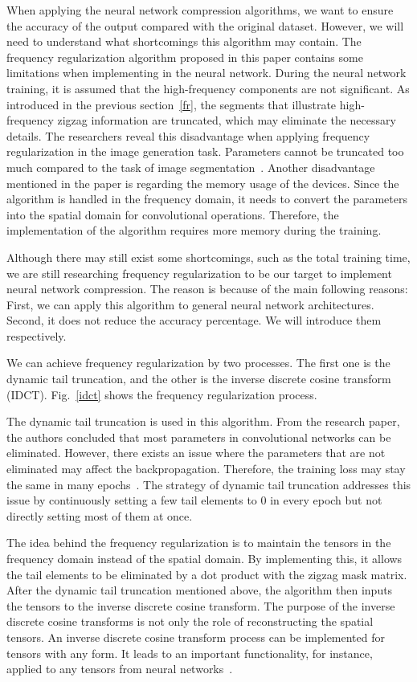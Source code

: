 \documentclass{article}
\begin{document}
When applying the neural network compression algorithms, we want to ensure the accuracy of the output compared with the original dataset. However, we will need to understand what shortcomings this algorithm may contain. The frequency regularization algorithm proposed in this paper contains some limitations when implementing in the neural network. During the neural network training, it is assumed that the high-frequency components are not significant. As introduced in the previous section~\ref{fr}, the segments that illustrate high-frequency zigzag information are truncated, which may eliminate the necessary details. The researchers reveal this disadvantage when applying frequency regularization in the image generation task. Parameters cannot be truncated too much compared to the task of image segmentation~\cite{zhao2023frequency}. Another disadvantage mentioned in the paper is regarding the memory usage of the devices. Since the algorithm is handled in the frequency domain, it needs to convert the parameters into the spatial domain for convolutional operations. Therefore, the implementation of the algorithm requires more memory during the training. 

Although there may still exist some shortcomings, such as the total training time, we are still researching frequency regularization to be our target to implement neural network compression. The reason is because of the main following reasons: First, we can apply this algorithm to general neural network architectures. Second, it does not reduce the accuracy percentage. We will introduce them respectively. 

We can achieve frequency regularization by two processes. The first one is the dynamic tail truncation, and the other is the inverse discrete cosine transform (IDCT). Fig.~\ref{idct} shows the frequency regularization process. 

The dynamic tail truncation is used in this algorithm. From the research paper, the authors concluded that most parameters in convolutional networks can be eliminated. However, there exists an issue where the parameters that are not eliminated may affect the backpropagation. Therefore, the training loss may stay the same in many epochs~\cite{zhao2023frequency}. The strategy of dynamic tail truncation addresses this issue by continuously setting a few tail elements to 0 in every epoch but not directly setting most of them at once.

The idea behind the frequency regularization is to maintain the tensors in the frequency domain instead of the spatial domain. By implementing this, it allows the tail elements to be eliminated by a dot product with the zigzag mask matrix. After the dynamic tail truncation mentioned above, the algorithm then inputs the tensors to the inverse discrete cosine transform. The purpose of the inverse discrete cosine transforms is not only the role of reconstructing the spatial tensors. An inverse discrete cosine transform process can be implemented for tensors with any form. It leads to an important functionality, for instance, applied to any tensors from neural networks~\cite{zhao2023frequency}. 
\end{document}

